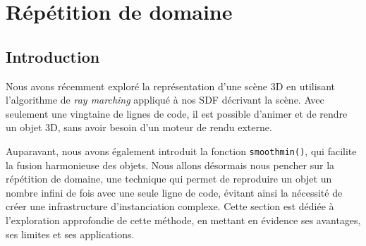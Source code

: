 \section{Répétition de domaine}

\subsection*{Introduction}
Nous avons récemment exploré la représentation d'une scène 3D en utilisant l'algorithme de \textit{ray marching} appliqué à nos SDF décrivant la scène. Avec seulement une vingtaine de lignes de code, il est possible d'animer et de rendre un objet 3D, sans avoir besoin d'un moteur de rendu externe.

Auparavant, nous avons également introduit la fonction \lstinline{smoothmin()}, qui facilite la fusion harmonieuse des objets. Nous allons désormais nous pencher sur la répétition de domaine, une technique qui permet de reproduire un objet un nombre infini de fois avec une seule ligne de code, évitant ainsi la nécessité de créer une infrastructure d'instanciation complexe. Cette section est dédiée à l'exploration approfondie de cette méthode, en mettant en évidence ses avantages, ses limites et ses applications.


